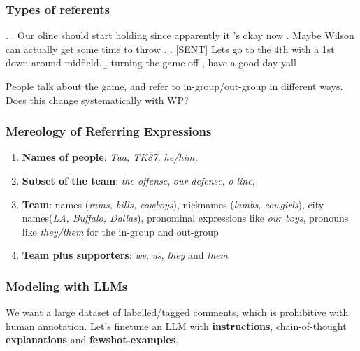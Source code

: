 \begin{frame}[c]\frametitle{Types of referents}

\ex. \a. \alert{Our oline} should start holding since apparently it ’s okay now . Maybe \alert{Wilson can} actually get some time to throw .\pause
    \b. \alert{[SENT]} Lets go to the 4th with a 1st down around midfield.\pause
    \b. turning the game off , have a good day yall
    
    \vfill\pause
    
People talk about the game, and refer to in-group/out-group in different ways. Does this change systematically with WP?

\end{frame}

\begin{frame}[c]\frametitle{Mereology of Referring Expressions}

\begin{enumerate}
    \itemsep=\baselineskip
    \item \textbf{Names of people}: \emph{Tua, TK87, he/him,}\textellipsis
    \item \textbf{Subset of the team}: \emph{the offense}, \emph{our defense}, \emph{o-line}, \textellipsis
    \item \textbf{Team}: names (\emph{rams, bills, cowboys}), nicknames (\emph{lambs, cowgirls}), city names(\emph{LA, Buffalo, Dallas}), pronominal expressions like \emph{our boys}, pronouns like \emph{they/them} for the in-group and out-group\textellipsis
    \item \textbf{Team plus supporters}: \emph{we}, \emph{us}, \emph{they} and \emph{them}
\end{enumerate}

\end{frame}

\begin{frame}[fragile]\frametitle{Modeling with LLMs}

    We want a large dataset of labelled/tagged comments, which is prohibitive with human annotation. Let's finetune an LLM with \textbf{instructions}, chain-of-thought \textbf{explanations} and \textbf{fewshot-examples}.
    
    
\end{frame}


